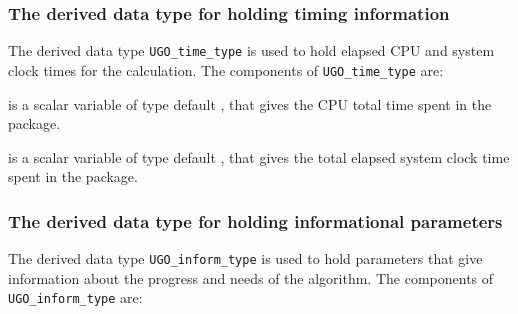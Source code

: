 \documentclass{galahad}
\newcommand{\packagename}{UGO}
\begin{document}

\subsubsection{The derived data type for holding timing
 information}\label{typetime}
The derived data type
{\tt \packagename\_time\_type}
is used to hold elapsed CPU and system clock times for the calculation.
The components of
{\tt \packagename\_time\_type}
are:
\begin{description}
 is a scalar variable of type default \real, that gives
 the CPU total time spent in the package.

 is a scalar variable of type default \real, that gives
 the total elapsed system clock time spent in the package.

\end{description}


\subsubsection{The derived data type for holding informational
 parameters}\label{typeinform}
The derived data type
{\tt \packagename\_inform\_type}
is used to hold parameters that give information about the progress and needs
of the algorithm. The components of
{\tt \packagename\_inform\_type}
are:
\end{document}
